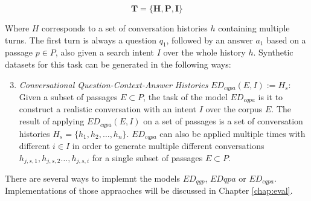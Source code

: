 \begin{equation}
    \mathbf{T = \{H, P, I\}}
    \label{eq:task_conversation}
\end{equation}

Where $H$ corresponds to a set of conversation histories $h$ containing multiple turns. The first turn is always a question $q_1$, followed by an answer $a_1$ based on a passage $p \in P$, also given a search intent $I$ over the whole history $h$. Synthetic datasets for this task can be generated in the following ways:

\begin{enumerate}
    \setcounter{enumi}{2} %
    \item \textit{Conversational Question-Context-Answer Histories} $ED_{cqpa}(E, I) := H_s$: Given a subset of passages $E \subset P$, the task of the model $ED_{cqpa}$ is it to construct a realistic conversation with an intent $I$ over the corpus $E$. The result of applying $ED_{cqpa}(E,I)$ on a set of passages is a set of conversation histories $H_s = \{h_1, h_2, \dots, h_n\}$. $ED_{cqpa}$ can also be applied multiple times with different $i \in I$ in order to generate multiple different conversations $h_{j,s,1}, h_{j,s,2} \dots , h_{j,s,i}$ for a single subset of passages $E \subset P$.
\end{enumerate}

There are several ways to implemnt the models $ED_{qgp}$, $ED{qpa}$ or $ED_{cqpa}$. Implementations of those appraoches will be discussed in Chapter \ref{chap:eval}. 



    
